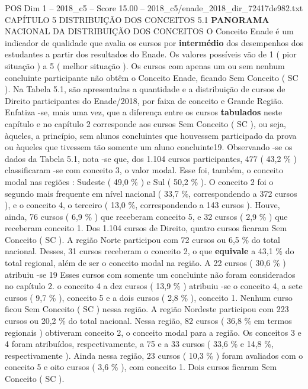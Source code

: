 \begin{textsample}{POS Dim 1 – 2018\_c5 – Score 15.00 – 2018\_c5/enade\_2018\_dir\_72417de982.txt}  \label{ex:f1_pos_068}
CAPÍTULO 5 DISTRIBUIÇÃO DOS CONCEITOS 5.1 \textbf{PANORAMA} NACIONAL DA DISTRIBUIÇÃO DOS CONCEITOS O Conceito Enade é um indicador de qualidade que avalia os cursos por \textbf{intermédio} dos desempenhos dos estudantes a partir dos resultados do Enade.
Os valores possíveis vão de 1 ( pior situação ) a 5 ( melhor situação ).
Os cursos com apenas um ou sem nenhum concluinte participante não obtêm o Conceito Enade, ficando Sem Conceito ( SC ).
Na Tabela 5.1, são apresentadas a quantidade e a distribuição de cursos de Direito participantes do Enade/2018, por faixa de conceito e Grande Região.
Enfatiza -se, mais uma vez, que a diferença entre os cursos \textbf{tabulados} neste capítulo e no capítulo 2 corresponde aos cursos Sem Conceito ( SC ), ou seja, àqueles, a princípio, sem alunos concluintes que houvessem participado da prova ou àqueles que tivessem tão somente um aluno concluinte19.
Observando -se os dados da Tabela 5.1, nota -se que, dos 1.104 cursos participantes, 477 ( 43,2 \% ) classificaram -se com conceito 3, o valor modal.
Esse foi, também, o conceito modal nas regiões : Sudeste ( 49,0 \% ) e Sul ( 50,2 \% ).
O conceito 2 foi o segundo mais frequente em nível nacional ( 33,7 \%, correspondendo a 372 cursos ), e o conceito 4, o terceiro ( 13,0 \%, correspondendo a 143 cursos ).
Houve, ainda, 76 cursos ( 6,9 \% ) que receberam conceito 5, e 32 cursos ( 2,9 \% ) que receberam conceito 1.
Dos 1.104 cursos de Direito, quatro cursos ficaram Sem Conceito ( SC ).
A região Norte participou com 72 cursos ou 6,5 \% do total nacional.
Desses, 31 cursos receberam o conceito 2, o que \textbf{equivale} a 43,1 \% do total regional, além de ser o conceito modal na região.
A 22 cursos ( 30,6 \% ) atribuiu -se 19 Esses cursos com somente um concluinte não foram considerados no capítulo 2. o conceito 4 a dez cursos ( 13,9 \% ) atribuiu -se o conceito 4, a sete cursos ( 9,7 \% ), conceito 5 e a dois cursos ( 2,8 \% ), conceito 1.
Nenhum curso ficou Sem Conceito ( SC ) nessa região.
A região Nordeste participou com 223 cursos ou 20,2 \% do total nacional.
Nessa região, 82 cursos ( 36,8 \% em termos regionais ) obtiveram conceito 2, o conceito modal para a região.
Os conceitos 3 e 4 foram atribuídos, respectivamente, a 75 e a 33 cursos ( 33,6 \% e 14,8 \%, respectivamente ).
Ainda nessa região, 23 cursos ( 10,3 \% ) foram avaliados com o conceito 5 e oito cursos ( 3,6 \% ), com conceito 1.
Dois cursos ficaram Sem Conceito ( SC ).

\end{textsample}
